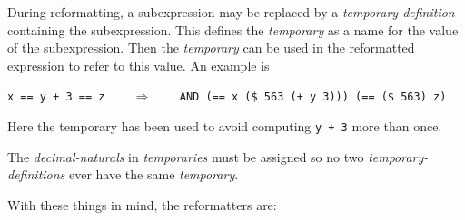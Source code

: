 \documentclass[12pt]{article}
\begin{document}
During reformatting, a subexpression may be replaced by
a {\em temporary-definition} containing the subexpression.  This
defines the {\em temporary} as a name for the value of the subexpression.
Then the {\em temporary} can be used in the reformatted
expression to refer to this value.  An example is

\begin{center}
\verb|x == y + 3 == z| ~~~ $\Longrightarrow$ ~~~
\verb|AND (== x ($ 563 (+ y 3))) (== ($ 563) z)|
\end{center}

Here the temporary has been used to avoid computing \verb|y + 3|
more than once.

The {\em decimal-naturals} in {\em temporaries} must be assigned so no
two {\em temporary-definitions} ever have the same {\em temporary}.

With these things in mind, the reformatters are:
\end{document}
